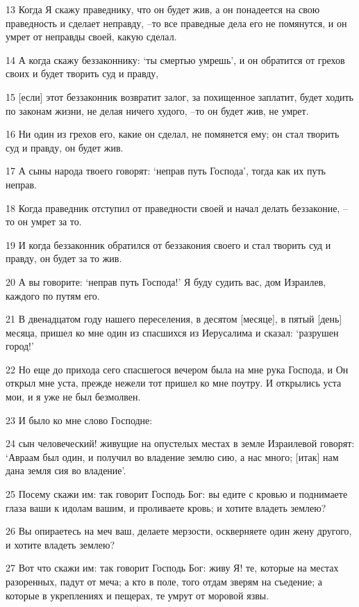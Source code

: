 \par 13 Когда Я скажу праведнику, что он будет жив, а он понадеется на свою праведность и сделает неправду, --то все праведные дела его не помянутся, и он умрет от неправды своей, какую сделал.
\par 14 А когда скажу беззаконнику: `ты смертью умрешь', и он обратится от грехов своих и будет творить суд и правду,
\par 15 [если] этот беззаконник возвратит залог, за похищенное заплатит, будет ходить по законам жизни, не делая ничего худого, --то он будет жив, не умрет.
\par 16 Ни один из грехов его, какие он сделал, не помянется ему; он стал творить суд и правду, он будет жив.
\par 17 А сыны народа твоего говорят: `неправ путь Господа', тогда как их путь неправ.
\par 18 Когда праведник отступил от праведности своей и начал делать беззаконие, --то он умрет за то.
\par 19 И когда беззаконник обратился от беззакония своего и стал творить суд и правду, он будет за то жив.
\par 20 А вы говорите: `неправ путь Господа!' Я буду судить вас, дом Израилев, каждого по путям его.
\par 21 В двенадцатом году нашего переселения, в десятом [месяце], в пятый [день] месяца, пришел ко мне один из спасшихся из Иерусалима и сказал: `разрушен город!'
\par 22 Но еще до прихода сего спасшегося вечером была на мне рука Господа, и Он открыл мне уста, прежде нежели тот пришел ко мне поутру. И открылись уста мои, и я уже не был безмолвен.
\par 23 И было ко мне слово Господне:
\par 24 сын человеческий! живущие на опустелых местах в земле Израилевой говорят: `Авраам был один, и получил во владение землю сию, а нас много; [итак] нам дана земля сия во владение'.
\par 25 Посему скажи им: так говорит Господь Бог: вы едите с кровью и поднимаете глаза ваши к идолам вашим, и проливаете кровь; и хотите владеть землею?
\par 26 Вы опираетесь на меч ваш, делаете мерзости, оскверняете один жену другого, и хотите владеть землею?
\par 27 Вот что скажи им: так говорит Господь Бог: живу Я! те, которые на местах разоренных, падут от меча; а кто в поле, того отдам зверям на съедение; а которые в укреплениях и пещерах, те умрут от моровой язвы.
